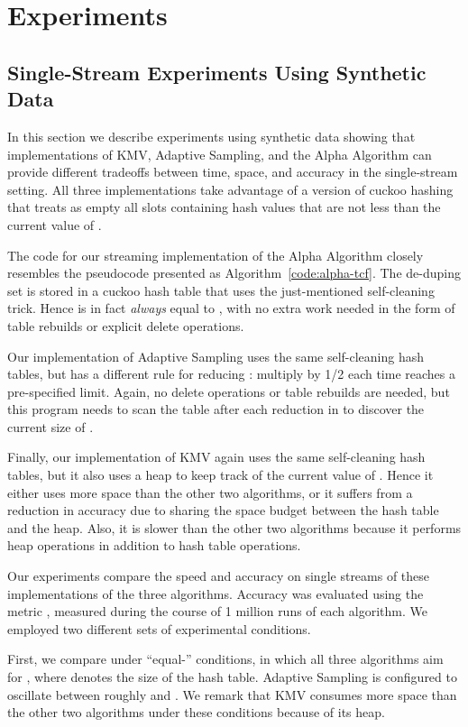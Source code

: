 \documentclass{article}
\begin{document}
\section{Experiments}
\subsection{Single-Stream Experiments Using Synthetic Data}
\label{sec:experiments}
\label{app:experiments}



In this section we describe experiments using synthetic data
showing that implementations of KMV, Adaptive Sampling, and the Alpha Algorithm can provide different tradeoffs
between time, space, and accuracy in the single-stream setting.
All three implementations take advantage of a version of cuckoo hashing
that treats as empty all slots containing hash values that are not
less than the current value of .

The code for our streaming implementation of the Alpha Algorithm
closely resembles the pseudocode presented as Algorithm~\ref{code:alpha-tcf}.
The de-duping set  is stored in a cuckoo hash table that uses the just-mentioned self-cleaning
trick. Hence  is in fact {\em always} equal to , with no extra
work needed in the form of table rebuilds or explicit delete operations.

Our implementation of Adaptive Sampling uses the same self-cleaning
hash tables, but has a different rule for reducing : multiply by 1/2
each time  reaches a pre-specified limit. Again, no delete operations
or table rebuilds are needed, but this program needs to scan the table
after each reduction in  to discover the current size of .

Finally, our implementation of KMV again uses the same self-cleaning
hash tables, but it also uses a heap to keep track of the current
value of . Hence it either uses more space than
the other two algorithms, or it suffers from a reduction in
accuracy due to sharing the space budget between the hash table
and the heap. Also, it is slower than the other two algorithms
because it performs heap operations in addition to hash table
operations.

Our experiments compare the speed and accuracy on single streams
of these implementations of the three algorithms. 
Accuracy was evaluated using the metric ,
measured during the course of 1 million runs of each algorithm.
We employed two different sets of experimental conditions. 

First, we compare under ``equal-'' conditions, in which all three
algorithms aim for , where  denotes the size of
the hash table. Adaptive Sampling is configured to oscillate between
roughly  and .  We remark that KMV
consumes more space than the other two algorithms under these
conditions because of its heap.
\end{document}
